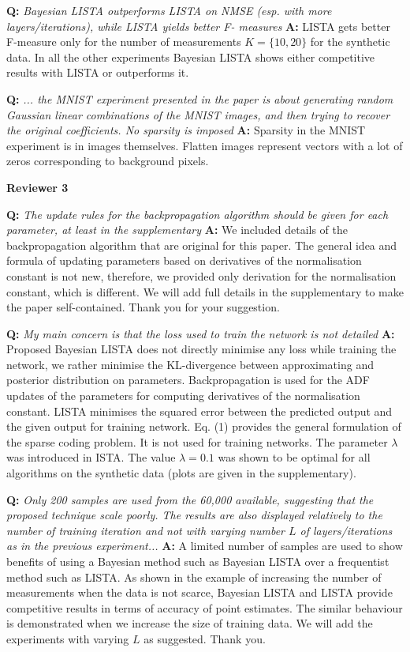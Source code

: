 \documentclass{article}
\begin{document}
\textbf{Q:} \textit{Bayesian LISTA outperforms LISTA on NMSE (esp. with more layers/iterations), while LISTA yields better F- measures} 
\textbf{A:} LISTA gets better F-measure only for the number of measurements $K = \{10, 20\}$ for the synthetic data. In all the other experiments Bayesian LISTA shows either competitive results with LISTA or outperforms it.

\textbf{Q:} \textit{... the MNIST experiment presented in the paper is about generating random Gaussian linear combinations of the MNIST images, and then trying to recover the original coefficients. No sparsity is imposed}
\textbf{A:} Sparsity in the MNIST experiment is in images themselves. Flatten images represent vectors with a lot of zeros corresponding to background pixels.

\textbf{Reviewer 3}

\textbf{Q:} \textit{The update rules for the backpropagation algorithm should be given for each parameter, at least in the supplementary} 
\textbf{A:} We included details of the backpropagation algorithm that are original for this paper. The general idea and formula of updating parameters based on derivatives of the normalisation constant is not new, therefore, we provided only derivation for the normalisation constant, which is different. We will add full details in the supplementary to make the paper self-contained. Thank you for your suggestion. 

\textbf{Q:} \textit{My main concern is that the loss used to train the network is not detailed}
\textbf{A:} Proposed Bayesian LISTA does not directly minimise any loss while training the network, we rather minimise the KL-divergence between approximating and posterior distribution on parameters. Backpropagation is used for the ADF updates of the parameters for computing derivatives of the normalisation constant. LISTA minimises the squared error between the predicted output and the given output for training network. Eq. (1) provides the general formulation of the sparse coding problem. It is not used for training networks. The parameter $\lambda$ was introduced in ISTA. The value $\lambda=0.1$ was shown to be optimal for all algorithms on the synthetic data (plots are given in the supplementary).

\textbf{Q:} \textit{Only 200 samples are used from the 60,000 available, suggesting that the proposed technique scale poorly. The results are also displayed relatively to the number of training iteration and not with varying number $L$ of layers/iterations as in the previous experiment...} 
\textbf{A:} A limited number of samples are used to show benefits of using a Bayesian method such as Bayesian LISTA over a frequentist method such as LISTA. As shown in the example of increasing the number of measurements when the data is not scarce, Bayesian LISTA and LISTA provide competitive results in terms of accuracy of point estimates. The similar behaviour is demonstrated when we increase the size of training data. We will add the experiments with varying $L$ as suggested. Thank you. 
\end{document}
